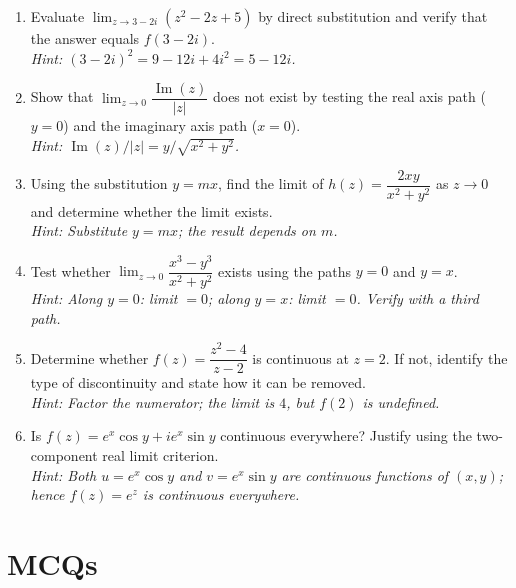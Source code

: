 \documentclass[12pt,a4paper]{article}
\begin{document}
\begin{enumerate}[leftmargin=*, label=\textbf{P\arabic*.}]

\item Evaluate $\lim_{z \to 3-2i}(z^2 - 2z + 5)$ by direct substitution and verify
that the answer equals $f(3-2i)$.\\
\textit{Hint: $(3-2i)^2 = 9 - 12i + 4i^2 = 5 - 12i$.}

\item Show that $\lim_{z \to 0} \dfrac{\operatorname{Im}(z)}{|z|}$ does not exist by
testing the real axis path ($y=0$) and the imaginary axis path ($x=0$).\\
\textit{Hint: $\operatorname{Im}(z)/|z| = y/\sqrt{x^2+y^2}$.}

\item Using the substitution $y = mx$, find the limit of
$h(z) = \dfrac{2xy}{x^2 + y^2}$ as $z \to 0$ and determine whether the limit exists.\\
\textit{Hint: Substitute $y = mx$; the result depends on $m$.}

\item Test whether $\lim_{z \to 0} \dfrac{x^3 - y^3}{x^2 + y^2}$ exists using the
paths $y = 0$ and $y = x$.\\
\textit{Hint: Along $y=0$: limit $= 0$; along $y=x$: limit $= 0$.  Verify with a third path.}

\item Determine whether $f(z) = \dfrac{z^2 - 4}{z - 2}$ is continuous at $z = 2$.
If not, identify the type of discontinuity and state how it can be removed.\\
\textit{Hint: Factor the numerator; the limit is $4$, but $f(2)$ is undefined.}

\item Is $f(z) = e^{x}\cos y + ie^{x}\sin y$ continuous everywhere?  Justify using
the two-component real limit criterion.\\
\textit{Hint: Both $u = e^x \cos y$ and $v = e^x \sin y$ are continuous functions of
$(x,y)$; hence $f(z) = e^z$ is continuous everywhere.}

\end{enumerate}

\section{MCQs}
\end{document}
